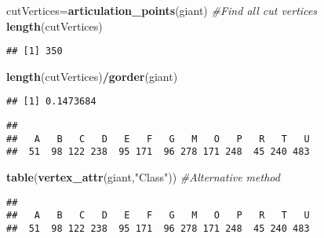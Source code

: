 \documentclass[
]{article}
\newenvironment{Shaded}{\begin{snugshade}}{\end{snugshade}}
\newcommand{\CommentTok}[1]{\textcolor[rgb]{0.56,0.35,0.01}{\textit{#1}}}
\newcommand{\KeywordTok}[1]{\textcolor[rgb]{0.13,0.29,0.53}{\textbf{#1}}}
\newcommand{\NormalTok}[1]{#1}
\newcommand{\OperatorTok}[1]{\textcolor[rgb]{0.81,0.36,0.00}{\textbf{#1}}}
\newcommand{\StringTok}[1]{\textcolor[rgb]{0.31,0.60,0.02}{#1}}
\begin{document}
\begin{Shaded}
\begin{Highlighting}[]
\NormalTok{cutVertices=}\KeywordTok{articulation_points}\NormalTok{(giant) }\CommentTok{#Find all cut vertices}
\KeywordTok{length}\NormalTok{(cutVertices)}
\end{Highlighting}
\end{Shaded}

\begin{verbatim}
## [1] 350
\end{verbatim}

\begin{Shaded}
\begin{Highlighting}[]
\KeywordTok{length}\NormalTok{(cutVertices)}\OperatorTok{/}\KeywordTok{gorder}\NormalTok{(giant)}
\end{Highlighting}
\end{Shaded}

\begin{verbatim}
## [1] 0.1473684
\end{verbatim}

\begin{Shaded}
\end{Shaded}

\begin{verbatim}
## 
##   A   B   C   D   E   F   G   M   O   P   R   T   U 
##  51  98 122 238  95 171  96 278 171 248  45 240 483
\end{verbatim}

\begin{Shaded}
\begin{Highlighting}[]
\KeywordTok{table}\NormalTok{(}\KeywordTok{vertex_attr}\NormalTok{(giant,}\StringTok{"Class"}\NormalTok{)) }\CommentTok{#Alternative method}
\end{Highlighting}
\end{Shaded}

\begin{verbatim}
## 
##   A   B   C   D   E   F   G   M   O   P   R   T   U 
##  51  98 122 238  95 171  96 278 171 248  45 240 483
\end{verbatim}
\end{document}
